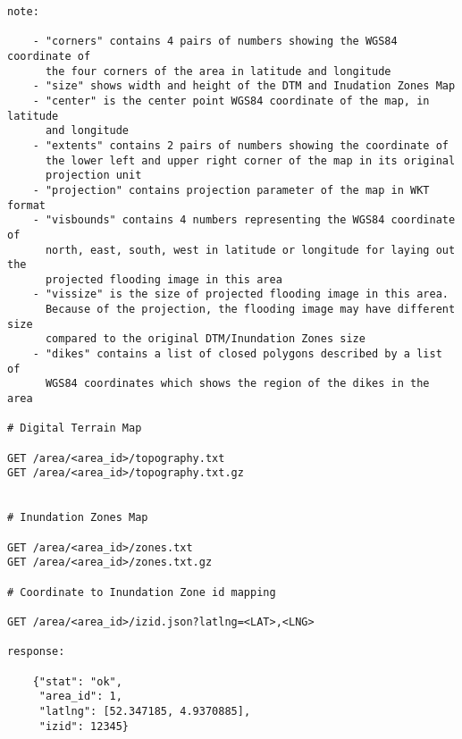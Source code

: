 \begin{lstlisting}
note:

    - "corners" contains 4 pairs of numbers showing the WGS84 coordinate of
      the four corners of the area in latitude and longitude
    - "size" shows width and height of the DTM and Inudation Zones Map
    - "center" is the center point WGS84 coordinate of the map, in latitude
      and longitude
    - "extents" contains 2 pairs of numbers showing the coordinate of
      the lower left and upper right corner of the map in its original
      projection unit
    - "projection" contains projection parameter of the map in WKT format
    - "visbounds" contains 4 numbers representing the WGS84 coordinate of
      north, east, south, west in latitude or longitude for laying out the
      projected flooding image in this area
    - "vissize" is the size of projected flooding image in this area.
      Because of the projection, the flooding image may have different size
      compared to the original DTM/Inundation Zones size
    - "dikes" contains a list of closed polygons described by a list of
      WGS84 coordinates which shows the region of the dikes in the area

# Digital Terrain Map

GET /area/<area_id>/topography.txt
GET /area/<area_id>/topography.txt.gz


# Inundation Zones Map

GET /area/<area_id>/zones.txt
GET /area/<area_id>/zones.txt.gz

# Coordinate to Inundation Zone id mapping

GET /area/<area_id>/izid.json?latlng=<LAT>,<LNG>

response:

    {"stat": "ok",
     "area_id": 1,
     "latlng": [52.347185, 4.9370885],
     "izid": 12345}
\end{lstlisting}